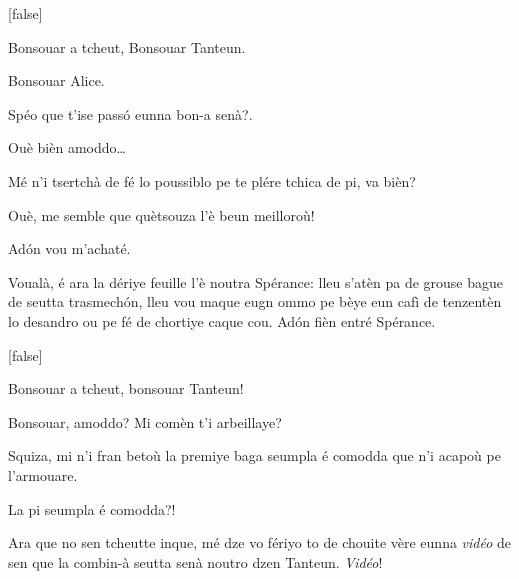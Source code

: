 \begin{drama}
[false]%


\Alicespeaks {} Bonsouar a tcheut, Bonsouar Tanteun. 

\Tanteunspeaks Bonsouar Alice.

\Alicespeaks Spéo que t'ise pass\'o eunna bon-a senà?.

\Tanteunspeaks Ouè bièn amoddo\ldots

\Alicespeaks Mé n'i tsertchà de fé lo poussiblo pe te plére tchica de pi, va bièn?

\Tanteunspeaks{} Ouè, me semble que quètsouza l'è beun meilloroù!

\Alicespeaks Ad\'on vou m'achaté.


\Mariespeaks{} Voualà, é ara la dériye feuille l'è noutra Spérance: lleu s'atèn pa de grouse bague de seutta trasmech\'on,  lleu vou maque eugn ommo pe bèye eun cafì de tenzentèn lo desandro ou pe fé de chortiye caque cou. Ad\'on fièn entré Spérance.

[false]%


\Sperancespeaks Bonsouar a tcheut, bonsouar Tanteun!

\Tanteunspeaks{} Bonsouar, amoddo? Mi comèn t'i ar\-be\-illaye?

\Sperancespeaks Squiza, mi n'i fran betoù la premiye baga seumpla é comodda que n'i acapoù pe l'armouare.

\Tanteunspeaks La pi seumpla é comodda?!



\Mariespeaks Ara que no sen tcheutte inque, mé dze vo fériyo to de chouite vère eunna \textit{vidéo} de sen que la combin-à seutta senà noutro dzen Tanteun. \textit{Vidéo}!



\end{drama}
